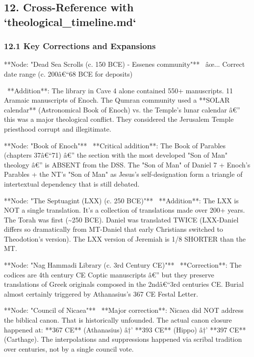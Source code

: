 \documentclass[aps,prd,11pt,onecolumn,superscriptaddress,nofootinbib,floatfix]{revtex4-2}
\begin{document}
\subsection{12. Cross-Reference with `theological\_timeline.md`}


\subsubsection{12.1 Key Corrections and Expansions}


**Node: "Dead Sea Scrolls (c. 150 BCE) - Essenes community"**
\textbullet~âœ... Correct date range (c. 200â€``68 BCE for deposits)

\textbullet~**Addition**: The library in Cave 4 alone contained 550+ manuscripts. 11 Aramaic manuscripts of Enoch. The Qumran community used a **SOLAR calendar** (Astronomical Book of Enoch) vs. the Temple's lunar calendar â€'' this was a major theological conflict. They considered the Jerusalem Temple priesthood corrupt and illegitimate.



**Node: "Book of Enoch"**
\textbullet~**Critical addition**: The Book of Parables (chapters 37â€``71) â€'' the section with the most developed "Son of Man" theology â€'' is ABSENT from the DSS. The "Son of Man" of Daniel 7 + Enoch's Parables + the NT's "Son of Man" as Jesus's self-designation form a triangle of intertextual dependency that is still debated.



**Node: "The Septuagint (LXX) (c. 250 BCE)"**
\textbullet~**Addition**: The LXX is NOT a single translation. It's a collection of translations made over 200+ years. The Torah was first (\textasciitilde{}250 BCE). Daniel was translated TWICE (LXX-Daniel differs so dramatically from MT-Daniel that early Christians switched to Theodotion's version). The LXX version of Jeremiah is 1/8 SHORTER than the MT.



**Node: "Nag Hammadi Library (c. 3rd Century CE)"**
\textbullet~**Correction**: The codices are 4th century CE Coptic manuscripts â€'' but they preserve translations of Greek originals composed in the 2ndâ€``3rd centuries CE. Burial almost certainly triggered by Athanasius's 367 CE Festal Letter.



**Node: "Council of Nicaea"**
\textbullet~**Major correction**: Nicaea did NOT address the biblical canon. That is historically unfounded. The actual canon closure happened at: **367 CE** (Athanasius) â†' **393 CE** (Hippo) â†' **397 CE** (Carthage). The interpolations and suppressions happened via scribal tradition over centuries, not by a single council vote.
\end{document}

